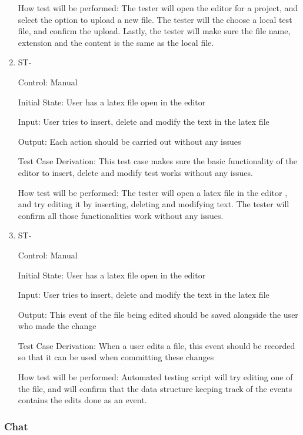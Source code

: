 \documentclass[12pt, titlepage]{article}
\newcounter{TESTID}
\newcommand\TESTNUM{\stepcounter{TESTID}\theTESTID}
\begin{document}
\begin{enumerate}
		How test will be performed: The tester will open the editor for a project, and select the option to upload a new file. The tester will the choose a local test file, and confirm the upload. Lastly, the tester will make sure the file name, extension and the content is the same as the local file.
		
		\item{ST-\TESTNUM\\}
		
		Control: Manual
		
		Initial State: User has a latex file open in the editor
		
		Input: User tries to insert, delete and modify the text in the latex file
		
		Output: Each action should be carried out without any issues
		
		Test Case Derivation: This test case makes sure the basic functionality of the editor to insert, delete and modify test works without any issues.
		
		How test will be performed: The tester will open a latex file in the editor , and try editing it by inserting, deleting and modifying text. The tester will confirm all those functionalities work without any issues.
		
		\item{ST-\TESTNUM\\}
		
		Control: Manual
		
		Initial State: User has a latex file open in the editor
		
		Input: User tries to insert, delete and modify the text in the latex file
		
		Output: This event of the file being edited should be saved alongside the user who made the change
		
		Test Case Derivation: When a user edits a file, this event should be recorded so that it can be used when committing these changes
		
		How test will be performed: Automated testing script will try editing one of the file, and will confirm that the data structure keeping track of the events contains the edits done as an event.
		
		
		
	\end{enumerate}
	
	\subsubsection{Chat}
	
\end{document}
